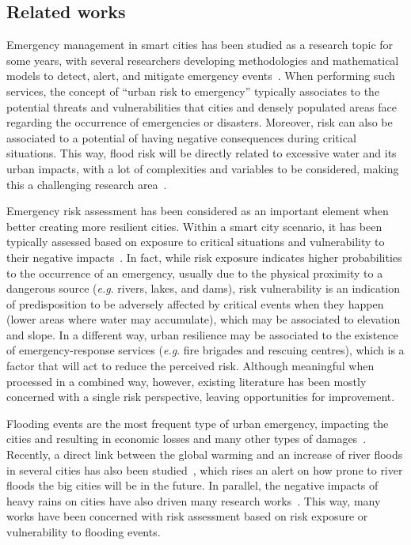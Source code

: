 \begin{refsection}
\section{Related works}
\label{sec:related_works}

Emergency management in smart cities has been studied as a research topic for some years, with several researchers developing methodologies and mathematical models to detect, alert, and mitigate emergency events~\cite{survey,survey2}. When performing such services, the concept of ``urban risk to emergency'' typically associates to the potential threats and vulnerabilities that cities and densely populated areas face regarding the occurrence of emergencies or disasters. Moreover, risk can also be associated to a potential of having negative consequences during critical situations. This way, flood risk will be directly related to excessive water and its urban impacts, with a lot of complexities and variables to be considered, making this a challenging research area~\cite{floodrisk,floodrisk2}. 

Emergency risk assessment has been considered as an important element when better creating more resilient cities. Within a smart city scenario, it has been typically assessed based on exposure to critical situations and vulnerability to their negative impacts~\cite{risks1}. In fact, while risk exposure indicates higher probabilities to the occurrence of an emergency, usually due to the physical proximity to a dangerous source (\textit{e.g}. rivers, lakes, and dams), risk vulnerability is an indication of predisposition to be adversely affected by critical events when they happen (lower areas where water may accumulate), which may be associated to elevation and slope. In a different way, urban resilience may be associated to the existence of emergency-response services (\textit{e.g}. fire brigades and rescuing centres), which is a factor that will act to reduce the perceived risk. Although meaningful when processed in a combined way, however, existing literature has been mostly concerned with a single risk perspective, leaving opportunities for improvement.

Flooding events are the most frequent type of urban emergency, impacting the cities and resulting in economic losses and many other types of damages~\cite{flood}. Recently, a direct link between the global warming and an increase of river floods in several cities has also been studied~\cite{warming,warming_bangladesh}, which rises an alert on how prone to river floods the big cities will be in the future. In parallel, the negative impacts of heavy rains on cities have also driven many research works~\cite{heavyrain1,heavyrain2}. This way, many works have been concerned with risk assessment based on risk exposure or vulnerability to flooding events.


\end{refsection}
